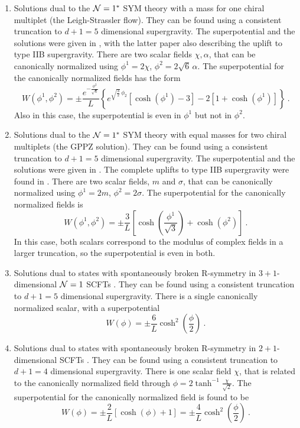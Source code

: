 \begin{enumerate}
\item Solutions dual to the ${\cal N}=1^*$ SYM theory with a mass for one chiral multiplet (the Leigh-Strassler flow). They can be found using a consistent truncation to $d+1=5$ dimensional supergravity. The superpotential and the solutions were given in \cite{Freedman:1999gp,Pilch:2000fu}, with the latter paper also describing the uplift to type IIB supergravity. There are two scalar fields $\chi,\alpha$, that can be canonically normalized using $\phi^1=2\chi$, $\phi^2 =2\sqrt{6}\,\alpha$. The superpotential for the canonically normalized fields has the form
\begin{equation}
	W(\phi^1,\phi^2)= \pm\frac{e^{-\frac{\phi^2}{\sqrt{6}}}}{L}\left\{e^{\sqrt{\frac{3}{2}}\,\phi_2}\left[\cosh\left(\phi^1\right)-3 \right] - 2\left[1 + \cosh\left(\phi^1\right)\right]\right\}\ .
\end{equation}
Also in this case, the superpotential is even in $\phi^1$ but not in $\phi^2$. 

\item Solutions dual to the ${\cal N}=1^*$ SYM theory with equal masses for two chiral multiplets (the GPPZ solution). They can be found using a consistent truncation to $d+1=5$ dimensional supergravity. The superpotential and the solutions were given in \cite{Girardello:1999bd}. The complete uplifts to type IIB supergravity were found in \cite{Bobev:2018eer,Petrini:2018pjk}. There are two scalar fields, $m$ and $\sigma$, that can be canonically normalized using $\phi^1= 2m$, $\phi^2 = 2\sigma$. The superpotential for the canonically normalized fields is
\begin{equation}
	W(\phi^1,\phi^2) = \pm \frac{3}{L}\left[\cosh\left({\frac{\phi^1}{\sqrt{3}}}\right)+\cosh\left({\phi^2}\right)\right]\ .
\end{equation}
In this case, both scalars correspond to the modulus of complex fields in a larger truncation, so the superpotential is even in both. 

\item Solutions dual to states with spontaneously broken R-symmetry in $3+1$-dimensional ${\cal N}=1$ SCFTs \cite{Gubser:2009qm}. They can be found using a consistent truncation to $d+1=5$ dimensional supergravity. There is a single canonically normalized scalar, with a superpotential \cite{Cassani:2010uw,Gauntlett:2010vu}
\begin{equation}
	W(\phi)= \pm \frac{6}{L}\cosh^2\left(\frac{\phi}{2}\right)\ .
\end{equation}
\item Solutions dual to states with spontaneously broken R-symmetry in $2+1$-dimensional SCFTs \cite{Gauntlett:2009dn}. They can be found using a consistent truncation to $d+1=4$ dimensional supergravity. There is one scalar field $\chi$, that is related to the canonically normalized field through $\phi=2\tanh^{-1}\frac{\chi}{\sqrt{2}}$. The superpotential for the canonically normalized field is found to be
\begin{equation}
	W(\phi)= \pm \frac{2}{L}\left[\cosh\left(\phi\right)+1\right]=\pm \frac{4}{L}\cosh^2\left(\frac{\phi}{2}\right)\ .
\end{equation}


\end{enumerate}
